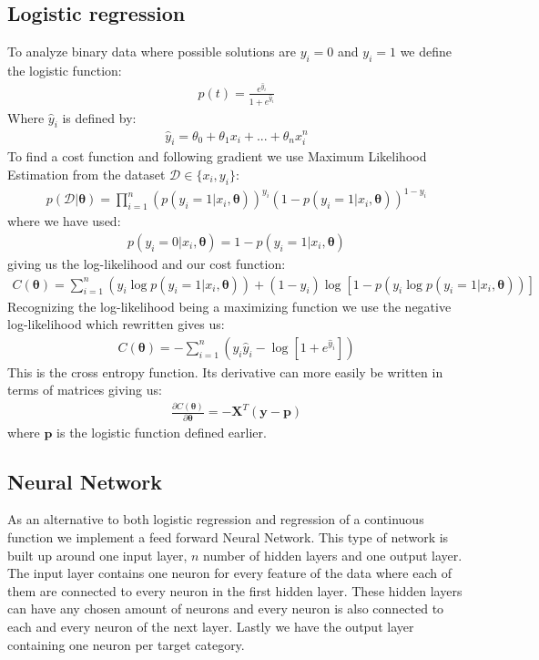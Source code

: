\documentclass[11pt]{article}
\begin{document}
\subsection{Logistic regression}
To analyze binary data where possible solutions are $y_i=0$ and $y_i=1$ we define the logistic function:
\begin{align*}
  p(t) =  \frac{e^{\hat{y}_i}}{1+e^{\hat{y}_i}}
\end{align*}
Where $\hat{y}_i$ is defined by:
\begin{align*}
  \hat{y}_i = \theta_0 + \theta_1 x_i +...+ \theta_n x_i^n
\end{align*}
To find a cost function and following gradient we use Maximum Likelihood Estimation from the dataset $\mathcal{D} \in \{x_i, y_i\}$:
\begin{align*}
  p(\mathcal{D}|\boldsymbol{\theta}) = \prod_{i=1}^n (p(y_i = 1|x_i,\boldsymbol{\theta}))^{y_i}\left( 1- p(y_i = 1 | x_i, \boldsymbol{\theta})\right)^{1-y_i}
\end{align*}
where we have used:
\begin{align*}
  p(y_i=0|x_i, \boldsymbol{\theta} ) = 1 - p(y_i=1 | x_i, \boldsymbol{\theta})
\end{align*}
giving us the log-likelihood and our cost function:
\begin{align*}
  C(\boldsymbol{\theta}) = \sum_{i=1}^n (y_i \log p(y_i =1 | x_i, \boldsymbol{\theta})) + (1- y_i) \log [1 - p(y_i \log p(y_i =1 | x_i, \boldsymbol{\theta}))]
\end{align*}
Recognizing the log-likelihood being a maximizing function we use the negative log-likelihood which rewritten gives us:
\begin{align*}
  C(\boldsymbol{\theta}) = -\sum_{i=1}^n (y_i \hat{y}_i - \log [1 + e^{\hat{y}_i}])
\end{align*}
This is the cross entropy function.
Its derivative can more easily be written in terms of matrices giving us:
\begin{align*}
  \frac{\partial C(\boldsymbol{\theta})}{\partial \boldsymbol{\theta}} = - \boldsymbol{X}^T (\boldsymbol{y}- \boldsymbol{p})
\end{align*}
where $\boldsymbol{p}$ is the logistic function defined earlier.
\subsection{Neural Network}
As an alternative to both logistic regression and regression of a continuous function we implement a feed forward Neural Network. This type of network is built up around one input layer, $n$ number of hidden layers and one output layer. The input layer contains one neuron for every feature of the data where each of them are connected to every neuron in the first hidden layer. These hidden layers can have any chosen amount of neurons and every neuron is also connected to each and every neuron of the next layer. Lastly we have the output layer containing one neuron per target category.
\end{document}
